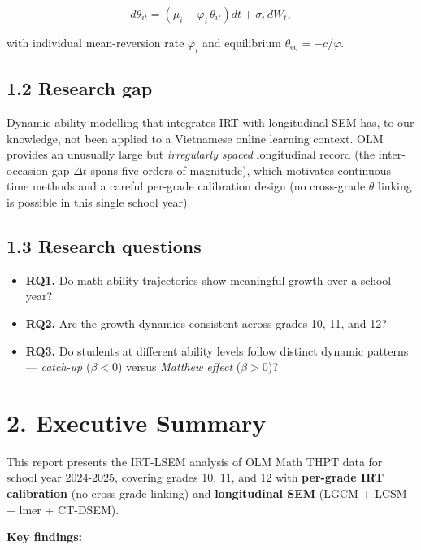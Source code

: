 \documentclass[
]{article}
\providecommand{\tightlist}{%
  \setlength{\itemsep}{0pt}\setlength{\parskip}{0pt}}
\begin{document}
\[
d\theta_{it} = \left(\mu_i - \varphi_i\,\theta_{it}\right)dt + \sigma_i\,dW_t,
\]

with individual mean-reversion rate \(\varphi_i\) and equilibrium
\(\theta_{\text{eq}} = -c/\varphi\).

\hypertarget{research-gap}{%
\subsection{1.2 Research gap}\label{research-gap}}

Dynamic-ability modelling that integrates IRT with longitudinal SEM has,
to our knowledge, not been applied to a Vietnamese online learning
context. OLM provides an unusually large but \emph{irregularly spaced}
longitudinal record (the inter-occasion gap \(\Delta t\) spans five
orders of magnitude), which motivates continuous-time methods and a
careful per-grade calibration design (no cross-grade \(\theta\) linking
is possible in this single school year).

\hypertarget{research-questions}{%
\subsection{1.3 Research questions}\label{research-questions}}

\begin{itemize}
\tightlist
\item
  \textbf{RQ1.} Do math-ability trajectories show meaningful growth over
  a school year?
\item
  \textbf{RQ2.} Are the growth dynamics consistent across grades 10, 11,
  and 12?
\item
  \textbf{RQ3.} Do students at different ability levels follow distinct
  dynamic patterns --- \emph{catch-up} (\(\beta < 0\)) versus
  \emph{Matthew effect} (\(\beta > 0\))?
\end{itemize}

\hypertarget{executive-summary}{%
\section{2. Executive Summary}\label{executive-summary}}

This report presents the IRT-LSEM analysis of OLM Math THPT data for
school year 2024-2025, covering grades 10, 11, and 12 with
\textbf{per-grade IRT calibration} (no cross-grade linking) and
\textbf{longitudinal SEM} (LGCM + LCSM + lmer + CT-DSEM).

\textbf{Key findings:}
\end{document}
